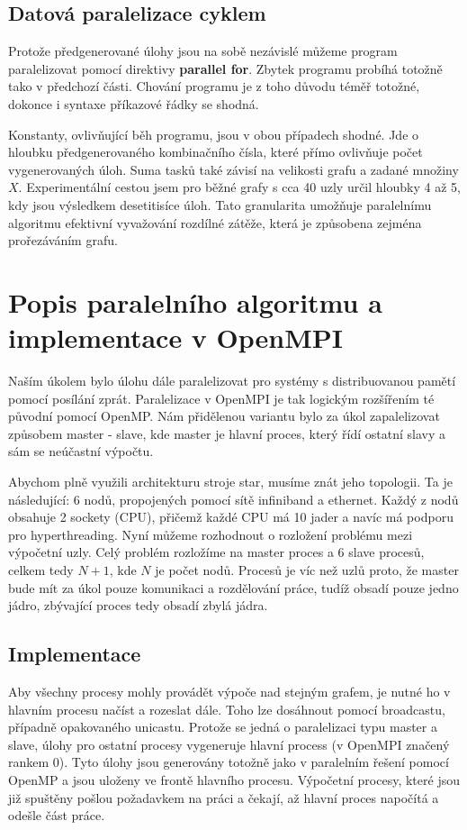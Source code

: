 \documentclass{article}
\begin{document}
\subsection{Datová paralelizace cyklem}
Protože předgenerované úlohy jsou na sobě nezávislé můžeme program paralelizovat pomocí direktivy \textbf{parallel for}. Zbytek programu probíhá totožně tako v předchozí části. Chování programu je z toho důvodu téměř totožné, dokonce i syntaxe příkazové řádky se shodná.

Konstanty, ovlivňující běh programu, jsou v obou případech shodné. Jde o hloubku předgenerovaného kombinačního čísla, které přímo ovlivňuje počet vygenerovaných úloh. Suma tasků také závisí na velikosti grafu a zadané množiny $X$. Experimentální cestou jsem pro běžné grafy s cca 40 uzly určil hloubky 4 až 5, kdy jsou výsledkem desetitisíce úloh. Tato granularita umožňuje paralelnímu algoritmu efektivní vyvažování rozdílné zátěže, která je způsobena zejména prořezáváním grafu.

\section{Popis paralelního algoritmu a implementace v OpenMPI}
Naším úkolem bylo úlohu dále paralelizovat pro systémy s distribuovanou pamětí pomocí posílání zprát. Paralelizace v OpenMPI je tak logickým rozšířením té původní pomocí OpenMP. Nám přidělenou variantu bylo za úkol zapalelizovat způsobem master - slave, kde master je hlavní proces, který řídí ostatní slavy a sám se neúčastní výpočtu.

Abychom plně využili architekturu stroje star, musíme znát jeho topologii. Ta je následující: 6 nodů, propojených pomocí sítě infiniband a ethernet. Každý z nodů obsahuje 2 sockety (CPU), přičemž každé CPU má 10 jader a navíc má podporu pro hyperthreading. Nyní můžeme rozhodnout o rozložení problému mezi výpočetní uzly. Celý problém rozložíme na master proces a 6 slave procesů, celkem tedy $N+1$, kde $N$ je počet nodů. Procesů je víc než uzlů proto, že master bude mít za úkol pouze komunikaci a rozdělování práce, tudíž obsadí pouze jedno jádro, zbývající proces tedy obsadí zbylá jádra.

\subsection{Implementace}
Aby všechny procesy mohly provádět výpoče nad stejným grafem, je nutné ho v hlavním procesu načíst a rozeslat dále. Toho lze dosáhnout pomocí broadcastu, případně opakovaného unicastu. Protože se jedná o paralelizaci typu master a slave, úlohy pro ostatní procesy vygeneruje hlavní process (v OpenMPI značený rankem $0$). Tyto úlohy jsou generovány totožně jako v paralelním řešení pomocí OpenMP a jsou uloženy ve frontě hlavního procesu. Výpočetní procesy, které jsou již spuštěny pošlou požadavkem na práci a čekají, až hlavní proces napočítá a odešle část práce. 
\end{document}
